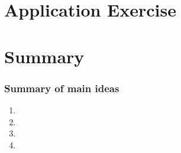 \documentclass[compress,11pt,t,professionalfonts,xcolor=table]{beamer}
\begin{document}

\section{Application Exercise}


\begin{frame}
\frametitle{}

\vfill




\vfill

\end{frame}


\section{Summary}


\begin{frame}
\frametitle{Summary of main ideas}

\vfill

\begin{enumerate}

\item {}

\item {}

\item {}

\item {}

\end{enumerate}

\vfill

\end{frame}

\end{document}
